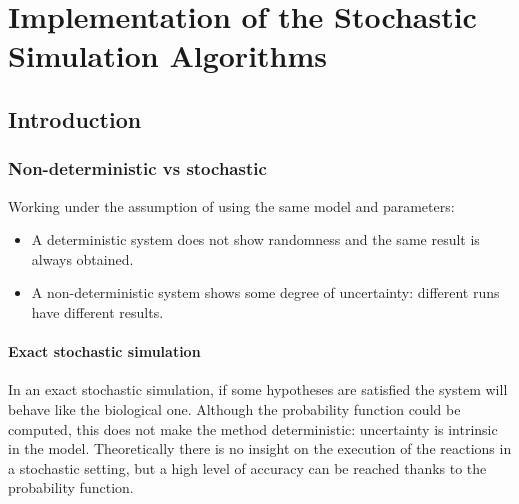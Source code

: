 \graphicspath{{chapters/03/images/}}
\chapter{Implementation of the Stochastic Simulation Algorithms}

\section{Introduction}

  \subsection{Non-deterministic vs stochastic}
  Working under the assumption of using the same model and parameters:

  \begin{multicols}{2}
    \begin{itemize}
      \item A deterministic system does not show randomness and the same result is always obtained.
      \item A non-deterministic system shows some degree of uncertainty: different runs have different results.
    \end{itemize}
  \end{multicols}

    \subsubsection{Exact stochastic simulation}
    In an exact stochastic simulation, if some hypotheses are satisfied the system will behave like the biological one.
    Although the probability function could be computed, this does not make the method deterministic: uncertainty is intrinsic in the model.
    Theoretically there is no insight on the execution of the reactions in a stochastic setting, but a high level of accuracy can be reached thanks to the probability function.

